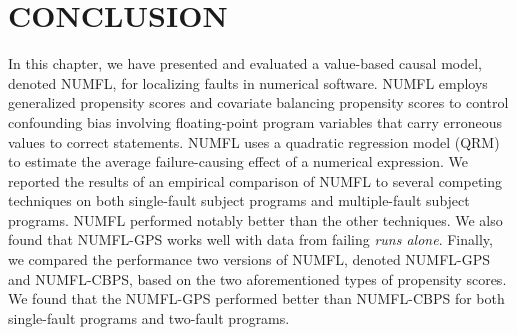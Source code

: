 \section{CONCLUSION}\label{conclusion}
In this chapter, we have presented and evaluated a value-based causal model, denoted NUMFL, for localizing faults in numerical software. NUMFL employs generalized propensity scores and covariate balancing propensity scores to control confounding bias involving floating-point program variables that carry erroneous values to correct statements.  NUMFL uses a quadratic regression model (QRM) to estimate the average failure-causing effect of a numerical expression.  We reported the results of an empirical comparison of NUMFL to several competing techniques on both single-fault subject programs and multiple-fault subject programs.  NUMFL performed notably better than the other techniques. We also found that NUMFL-GPS works well with data from failing {\it runs alone}.  Finally, we compared the performance two versions of NUMFL, denoted NUMFL-GPS and NUMFL-CBPS, based on the two aforementioned types of propensity scores. We found that the NUMFL-GPS performed better than NUMFL-CBPS for both single-fault programs and two-fault programs. 